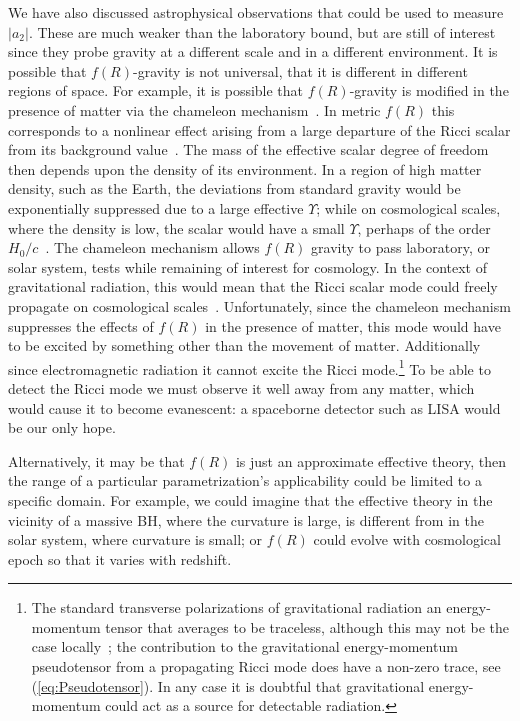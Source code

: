 \documentclass[aps,prd,amsfonts,amssymb,amsmath,nofootinbib,reprint,showpacs]{revtex4-1}
\newcommand{\eqnref}[1]{(\ref{eq:#1})}
\begin{document}
We have also discussed astrophysical observations that could be used to measure $|a_2|$. These are much weaker than the laboratory bound, but are still of interest since they probe gravity at a different scale and in a different environment. It is possible that $f(R)$-gravity is not universal, that it is different in different regions of space. For example, it is possible that $f(R)$-gravity is modified in the presence of matter via the chameleon mechanism~\cite{Khoury2004, Khoury2004a}. In metric $f(R)$ this corresponds to a nonlinear effect arising from a large departure of the Ricci scalar from its background value~\cite{DeFelice2010}. The mass of the effective scalar degree of freedom then depends upon the density of its environment. In a region of high matter density, such as the Earth, the deviations from standard gravity would be exponentially suppressed due to a large effective $\Upsilon$; while on cosmological scales, where the density is low, the scalar would have a small $\Upsilon$, perhaps of the order $H_0/c$~\cite{Khoury2004, Khoury2004a}. The chameleon mechanism allows $f(R)$ gravity to pass laboratory, or solar system, tests while remaining of interest for cosmology. In the context of gravitational radiation, this would mean that the Ricci scalar mode could freely propagate on cosmological scales~\cite{Corda2009}. Unfortunately, since the chameleon mechanism suppresses the effects of $f(R)$ in the presence of matter, this mode would have to be excited by something other than the movement of matter. Additionally since electromagnetic radiation it cannot excite the Ricci mode.\footnote{The standard transverse polarizations of gravitational radiation an energy-momentum tensor that averages to be traceless, although this may not be the case locally~\cite{Butcher2010}; the contribution to the gravitational energy-momentum pseudotensor from a propagating Ricci mode does have a non-zero trace, see \eqnref{Pseudotensor}. In any case it is doubtful that gravitational energy-momentum could act as a source for detectable radiation.} To be able to detect the Ricci mode we must observe it well away from any matter, which would cause it to become evanescent: a spaceborne detector such as LISA would be our only hope.

Alternatively, it may be that $f(R)$ is just an approximate effective theory, then the range of a particular parametrization's applicability could be limited to a specific domain. For example, we could imagine that the effective theory in the vicinity of a massive BH, where the curvature is large, is different from in the solar system, where curvature is small; or $f(R)$ could evolve with cosmological epoch so that it varies with redshift.
\end{document}
